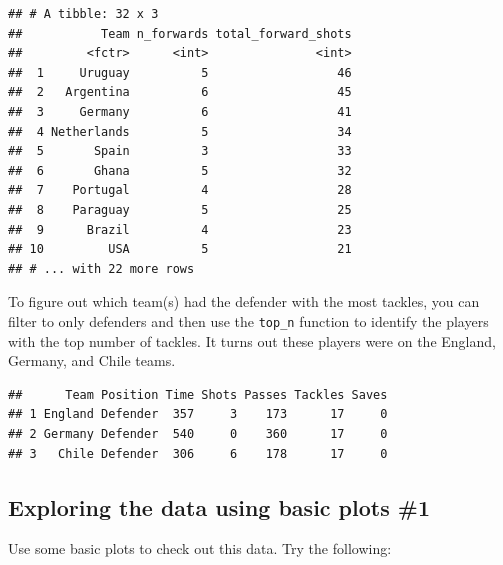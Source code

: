 \documentclass[]{book}
\makeatletter
\newenvironment{Shaded}{\begin{snugshade}}{\end{snugshade}}
\newcommand{\KeywordTok}[1]{\textcolor[rgb]{0.13,0.29,0.53}{\textbf{#1}}}
\newcommand{\DataTypeTok}[1]{\textcolor[rgb]{0.13,0.29,0.53}{#1}}
\newcommand{\DecValTok}[1]{\textcolor[rgb]{0.00,0.00,0.81}{#1}}
\newcommand{\StringTok}[1]{\textcolor[rgb]{0.31,0.60,0.02}{#1}}
\newcommand{\OperatorTok}[1]{\textcolor[rgb]{0.81,0.36,0.00}{\textbf{#1}}}
\newcommand{\NormalTok}[1]{#1}
\newenvironment{kframe}{%
\medskip{}
\setlength{\fboxsep}{.8em}
 \def\at@end@of@kframe{}%
 \ifinner\ifhmode%
  \def\at@end@of@kframe{\end{minipage}}%
  \begin{minipage}{\columnwidth}%
 \fi\fi%
 \def\FrameCommand##1{\hskip\@totalleftmargin \hskip-\fboxsep
 \colorbox{shadecolor}{##1}\hskip-\fboxsep
     \hskip-\linewidth \hskip-\@totalleftmargin \hskip\columnwidth}%
 \MakeFramed {\advance\hsize-\width
   \@totalleftmargin\z@ \linewidth\hsize
   \@setminipage}}%
 {\par\unskip\endMakeFramed%
 \at@end@of@kframe}
\renewenvironment{Shaded}{\begin{kframe}}{\end{kframe}}
\theoremstyle{definition}
\theoremstyle{definition}
\theoremstyle{definition}
\theoremstyle{remark}
\makeatother
\begin{document}
\begin{verbatim}
## # A tibble: 32 x 3
##           Team n_forwards total_forward_shots
##         <fctr>      <int>               <int>
##  1     Uruguay          5                  46
##  2   Argentina          6                  45
##  3     Germany          6                  41
##  4 Netherlands          5                  34
##  5       Spain          3                  33
##  6       Ghana          5                  32
##  7    Portugal          4                  28
##  8    Paraguay          5                  25
##  9      Brazil          4                  23
## 10         USA          5                  21
## # ... with 22 more rows
\end{verbatim}

To figure out which team(s) had the defender with the most tackles, you
can filter to only defenders and then use the \texttt{top\_n} function
to identify the players with the top number of tackles. It turns out
these players were on the England, Germany, and Chile teams.

\begin{Shaded}
\end{Shaded}

\begin{verbatim}
##      Team Position Time Shots Passes Tackles Saves
## 1 England Defender  357     3    173      17     0
## 2 Germany Defender  540     0    360      17     0
## 3   Chile Defender  306     6    178      17     0
\end{verbatim}

\subsection{Exploring the data using basic plots
\#1}\label{exploring-the-data-using-basic-plots-1}

Use some basic plots to check out this data. Try the following:
\end{document}
